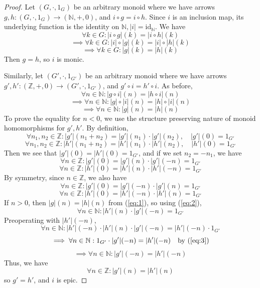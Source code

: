 \documentclass[11pt]{article} %
\theoremstyle{definition}
\begin{document}
\begin{proof}
    Let $(G,\cdot,1_G)$ be an arbitrary monoid where we have arrows $g,h:(G,\cdot,1_G)\rightarrow(\mathbb{N},+,0)$,
    and $i\circ g=i\circ h$.
    Since $i$ is an inclusion map, its underlying function is the identity on $\mathbb{N},|i|=\text{id}_\mathbb{N}$.
    We have
    \[\forall k\in G:|i\circ g|(k)=|i\circ h|(k)\]
    \[\implies\forall k\in G:|i| \circ |g|(k)=|i|\circ |h|(k)\]
    \[\implies\forall k\in G: |g|(k)= |h|(k)\]
    Then $g=h$, so $i$ is monic.

    Similarly, let $(G',\cdot,1_{G'})$ be an arbitrary monoid 
    where we have arrows $g',h':(\mathbb{Z},+,0)\rightarrow(G',\cdot,1_{G'})$,
    and $g'\circ i=h'\circ i$. 
    As before,
    \[\forall n\in \mathbb{N}:|g\circ i|(n)=|h\circ i|(n)\]
    \[\implies\forall n\in \mathbb{N}:|g| \circ |i|(n)=|h|\circ |i|(n)\]
    \begin{equation}
        \implies\forall n\in \mathbb{N}: |g|(n)= |h|(n)
        \label{eq:1}
    \end{equation}
    To prove the equality for $n<0$, we use the structure preserving nature of monoid homomorphisms for $g',h'$.
    By definition,
    \[\forall n_1,n_2\in\mathbb{Z}:|g'|(n_1+n_2)=|g'|(n_1)\cdot |g'|(n_2),\quad |g'|(0)=1_{G'}\]
    \[\forall n_1,n_2\in\mathbb{Z}:|h'|(n_1+n_2)=|h'|(n_1)\cdot |h'|(n_2),\quad |h'|(0)=1_{G'}\]
    Then we see that $|g'|(0)=|h'|(0)=1_{G'}$, and if we set $n_2=-n_1$, we have
    \begin{equation}
        \forall n\in\mathbb{Z}:|g'|(0)=|g'|(n)\cdot |g'|(-n)=1_{G'}
        \label{eq:2}
    \end{equation}
    \[\forall n\in\mathbb{Z}:|h'|(0)=|h'|(n)\cdot |h'|(-n)=1_{G'}\]
    By symmetry, since $n\in\mathbb{Z}$, we also have 
    \[\forall n\in\mathbb{Z}:|g'|(0)=|g'|(-n)\cdot |g'|(n)=1_{G'}\]
    \begin{equation}
        \forall n\in\mathbb{Z}:|h'|(0)=|h'|(-n)\cdot |h'|(n)=1_{G'}
        \label{eq:3}
    \end{equation}
    \[\]
    If $n>0$, then $|g|(n)= |h|(n)$ from (\ref{eq:1}), so using (\ref{eq:2}),
    \[\forall n\in\mathbb{N}:|h'|(n)\cdot |g'|(-n)=1_{G'}\]
    Preoperating with $|h'|(-n)$,
    \[\forall n\in\mathbb{N}:|h'|(-n)\cdot |h'|(n)\cdot |g'|(-n)=|h'|(-n)\cdot 1_{G'}\]
    \[\implies \forall n\in\mathbb{N}:1_{G'}\cdot |g'|(-n)=|h'|(-n) \quad\text{by (\ref{eq:3})}\]
    \[\implies \forall n\in\mathbb{N}:|g'|(-n)=|h'|(-n)\]
    Thus, we have
    \[\forall n\in\mathbb{Z}:|g'|(n)=|h'|(n)\]
    so $g'=h'$, and $i$ is epic.
\end{proof}
\end{document}
